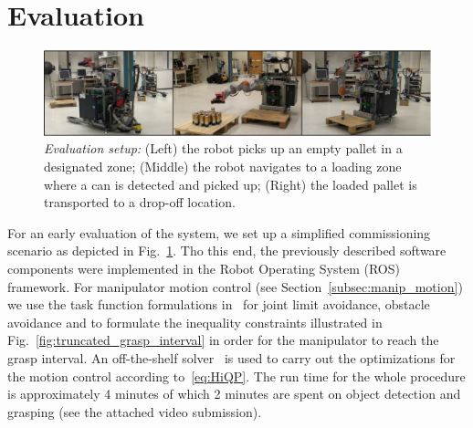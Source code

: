 \section{Evaluation}
\label{sec:eval}
% 
\begin{figure}[t!]
  \begin{center}
    \includegraphics[width =1\linewidth]{figs/evaluation}
    \caption{\textit{Evaluation setup:} (Left) the robot picks up an empty pallet in a designated
      zone; (Middle) the robot navigates to a loading zone where a can is detected and picked up;
      (Right) the loaded pallet is transported to a drop-off location.}
    \label{fig:evaluation}
    \vspace{-0.5cm}
  \end{center}
\end{figure}
% 
For an early evaluation of the system, we set up a simplified commissioning scenario as depicted in
Fig.~\ref{fig:evaluation}. Tho this end, the previously described software components were
implemented in the Robot Operating System (ROS)~\cite{Quig09} framework. For manipulator motion
control (see Section~\ref{subsec:manip_motion}) we use the task function formulations
in~\cite{Kano09} for joint limit avoidance, obstacle avoidance and to formulate the inequality
constraints illustrated in Fig.~\ref{fig:truncated_grasp_interval} in order for the manipulator to
reach the grasp interval. An off-the-shelf solver~\cite{Guro15} is used to carry out the
optimizations for the motion control according to~\eqref{eq:HiQP}. The run time for the whole
procedure is approximately 4 minutes of which 2 minutes are spent on object detection and grasping
(see the attached video submission).


